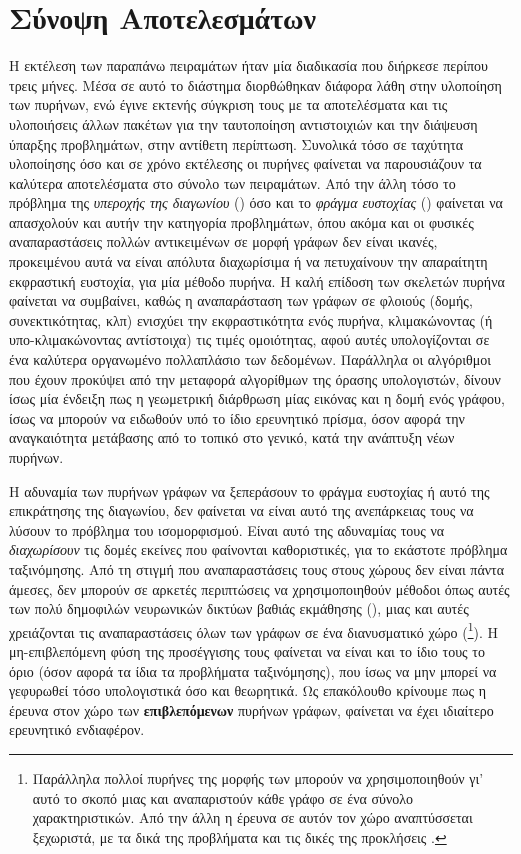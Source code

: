 \section{Σύνοψη Αποτελεσμάτων}
Η εκτέλεση των παραπάνω πειραμάτων ήταν μία διαδικασία που διήρκεσε περίπου τρεις μήνες.
Μέσα σε αυτό το διάστημα διορθώθηκαν διάφορα λάθη στην υλοποίηση των πυρήνων, ενώ έγινε εκτενής σύγκριση τους με τα αποτελέσματα και τις υλοποιήσεις άλλων πακέτων για την ταυτοποίηση αντιστοιχιών και την διάψευση ύπαρξης προβλημάτων, στην αντίθετη περίπτωση.
Συνολικά τόσο σε ταχύτητα υλοποίησης όσο και σε χρόνο εκτέλεσης οι πυρήνες  φαίνεται να παρουσιάζουν τα καλύτερα αποτελέσματα στο σύνολο των πειραμάτων.
Από την άλλη τόσο το πρόβλημα της \textit{υπεροχής της διαγωνίου} () όσο και το \textit{φράγμα ευστοχίας} () φαίνεται να απασχολούν και αυτήν την κατηγορία προβλημάτων, όπου ακόμα και οι φυσικές αναπαραστάσεις πολλών αντικειμένων σε μορφή γράφων δεν είναι ικανές, προκειμένου αυτά να είναι απόλυτα διαχωρίσιμα ή να πετυχαίνουν την απαραίτητη εκφραστική ευστοχία, για μία μέθοδο πυρήνα.
Η καλή επίδοση των σκελετών πυρήνα φαίνεται να συμβαίνει, καθώς η αναπαράσταση των γράφων σε φλοιούς (δομής, συνεκτικότητας, κλπ) ενισχύει την εκφραστικότητα ενός πυρήνα, κλιμακώνοντας (ή υπο-κλιμακώνοντας αντίστοιχα) τις τιμές ομοιότητας, αφού αυτές υπολογίζονται σε ένα καλύτερα οργανωμένο πολλαπλάσιο των δεδομένων.
Παράλληλα οι αλγόριθμοι  που έχουν προκύψει από την μεταφορά αλγορίθμων της όρασης υπολογιστών, δίνουν ίσως μία ένδειξη πως η γεωμετρική διάρθρωση μίας εικόνας και η δομή ενός γράφου, ίσως να μπορούν να ειδωθούν υπό το ίδιο ερευνητικό πρίσμα, όσον αφορά την αναγκαιότητα μετάβασης από το τοπικό στο γενικό, κατά την ανάπτυξη νέων πυρήνων.\par
Η αδυναμία των πυρήνων γράφων να ξεπεράσουν το φράγμα ευστοχίας ή αυτό της επικράτησης της διαγωνίου, δεν φαίνεται να είναι αυτό της ανεπάρκειας τους να λύσουν το πρόβλημα του ισομορφισμού.
Είναι αυτό της αδυναμίας τους να \textit{διαχωρίσουν} τις δομές εκείνες που φαίνονται καθοριστικές, για το εκάστοτε πρόβλημα ταξινόμησης.
Από τη στιγμή που αναπαραστάσεις τους στους χώρους  δεν είναι πάντα άμεσες, δεν μπορούν σε αρκετές περιπτώσεις  να χρησιμοποιηθούν μέθοδοι όπως αυτές των πολύ δημοφιλών νευρωνικών δικτύων βαθιάς εκμάθησης (), μιας και αυτές χρειάζονται τις αναπαραστάσεις όλων των γράφων σε ένα διανυσματικό χώρο (\footnote{Παράλληλα πολλοί πυρήνες της μορφής των  μπορούν να χρησιμοποιηθούν γι' αυτό το σκοπό μιας και αναπαριστούν κάθε γράφο σε ένα σύνολο χαρακτηριστικών. Από την άλλη η έρευνα σε αυτόν τον χώρο αναπτύσσεται ξεχωριστά, με τα δικά της προβλήματα και τις δικές της προκλήσεις \cite{graphembeddings}.}).
Η μη-επιβλεπόμενη φύση της προσέγγισης τους φαίνεται να είναι και το ίδιο τους το όριο (όσον αφορά τα ίδια τα προβλήματα ταξινόμησης), που ίσως να μην μπορεί να γεφυρωθεί τόσο υπολογιστικά όσο και θεωρητικά.
Ως επακόλουθο κρίνουμε πως η έρευνα στον χώρο των \textbf{επιβλεπόμενων} πυρήνων γράφων, φαίνεται να έχει ιδιαίτερο ερευνητικό ενδιαφέρον.
